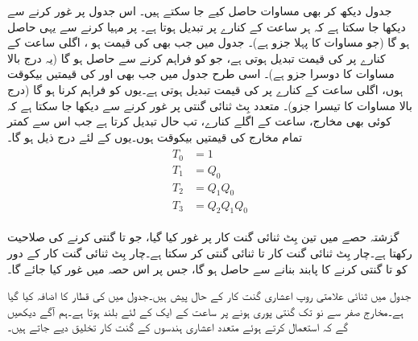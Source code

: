  جدول     دیکھ کر بھی مساوات      حاصل کیے جا  سکتے ہیں۔ اس  جدول پر غور کرنے سے دیکھا جا سکتا ہے کہ   ہر ساعت کے کنارے  پر  تبدیل ہوتا ہے۔   پر  مہیا کرنے سے  یہی حاصل ہو گا  (جو مساوات   کا پہلا جزو ہے)۔  جدول میں   جب بھی   کی قیمت   ہو ، اگلی ساعت کے کنارے پر  کی قیمت تبدیل ہوتی ہے، جو   کو   فراہم کرنے سے حاصل   ہو گا (یہ درج بالا مساوات کا دوسرا جزو ہے)۔ اسی طرح جدول میں جب  بھی   اور   کی قیمتیں  بیکوقت  ہوں، اگلی ساعت کے کنارے پر  کی قیمت تبدیل ہوتی ہے۔یوں  کو   فراہم کرنا ہو گا (درج بالا مساوات کا تیسرا جزو)۔ متعدد بِٹ ثنائی گنتی پر غور کرنے سے  دیکھا جا سکتا ہے کہ کوئی بھی مخارج، ساعت کے اگلے کنارے، تب  حال تبدیل کرتا ہے جب اس سے کمتر تمام مخارج کی قیمتیں بیکوقت   ہوں۔یوں  کے لئے  درج ذیل ہو گا۔
\begin{gather}
\begin{aligned}
T_0&=1\\
T_1&=Q_0\\
T_2&=Q_1Q_0\\
T_3&=Q_2Q_1Q_0
\end{aligned}
\end{gather}

گزشتہ حصے میں تین بِٹ ثنائی گنت کار پر غور کیا گیا، جو   تا  گنتی کرنے کی صلاحیت رکھتا ہے۔چار بِٹ   ثنائی گنت کار   تا   ثنائی گنتی کر سکتا ہے۔چار بِٹ ثنائی گنت کار کے دور کو   تا  گنتی کرنے  کا پابند  بنانے سے  حاصل ہو گا، جس پر اس حصہ میں غور کیا جائے گا۔

جدول   میں  ثنائی علامتی روپ اعشاری گنت کار کے حال  پیش ہیں۔جدول میں   کی قطار کا اضافہ کیا گیا ہے۔مخارج   صفر سے نو تک گنتی پوری ہونے پر ساعت کے ایک کے لئے بلند ہوتا ہے۔ہم آگے دیکھیں گے کہ    استعمال کرتے   ہوئے متعدد اعشاری ہندسوں  کے  گنت کار  تخلیق دیے  جاتے ہیں۔

